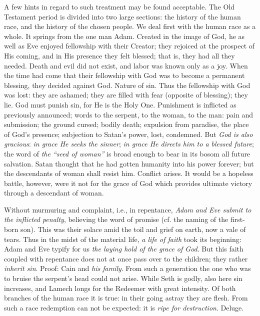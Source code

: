 A few hints in regard to such treatment may be found acceptable. The Old Testament period is divided into two large sections: the history of the human race, and the history of the chosen people. We deal first with the human race as a whole. It springs from the one man Adam. Created in the image of God, he as well as Eve enjoyed fellowship with their Creator; they rejoiced at the prospect of His coming, and in His presence they felt blessed; that is, they had all they needed. Death and evil did not exist, and labor was known only as a joy. When the time had come that their fellowship with God was to become a permanent blessing, they decided against God. Nature of sin. Thus the fellowship with God was lost: they are ashamed; they are filled with fear (opposite of blessing); they lie. God must punish sin, for He is the Holy One. Punishment is inflicted as previously announced; words to the serpent, to the woman, to the man: pain and submission; the ground cursed; bodily death; expulsion from paradise, the place
of God’s presence; subjection to Satan’s power, lost, condemned. But \emph{God is also gracious}: \emph{in grace He seeks the sinner}; \emph{in grace He directs him to a blessed future}; the word of \emph{the “seed of woman”} is broad enough to bear in its bosom all future salvation. Satan thought that he had gotten humanity into his power forever; but the descendants of woman shall resist him. Conflict arises. It would be a hopeless battle, however, were it not for the grace of God which provides ultimate victory through a descendant of woman.

Without murmuring and complaint, i.e., in repentance, \emph{Adam and Eve submit to the inflicted penalty}, believing the word of promise (cf. the naming of the first-born son). This was their solace amid the toil and grief on earth, now a vale of tears. Thus in the midst of the material life, \emph{a life of faith} took its beginning: Adam and Eve typify for us \emph{the laying hold of the grace of God}. But this faith coupled with repentance does not at once pass over to the children; they rather \emph{inherit sin}. Proof: Cain and \emph{his family}. From such a generation the one who was to bruise the serpent’s head could not arise. While Seth is godly, also here sin increases, and Lamech longs for the Redeemer with great intensity. Of both branches of the human race it is true: in their going astray they are flesh. From such a race redemption can not be expected: it is \emph{ripe for destruction}. Deluge.

